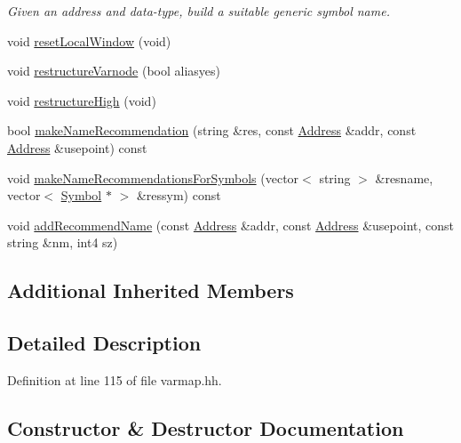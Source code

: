 \begin{DoxyCompactItemize}
\begin{DoxyCompactList}\small\item\em Given an address and data-\/type, build a suitable generic symbol name. \end{DoxyCompactList}\item 
void \mbox{\hyperlink{class_scope_local_a3bf9941188eb64423d2ed49a08dab8ca}{reset\+Local\+Window}} (void)
\item 
void \mbox{\hyperlink{class_scope_local_a4f0d61de6d043ae92af2c2cf1836453a}{restructure\+Varnode}} (bool aliasyes)
\item 
void \mbox{\hyperlink{class_scope_local_a308e308109ca1964d49d6a3a539a9acf}{restructure\+High}} (void)
\item 
bool \mbox{\hyperlink{class_scope_local_aff7d78a874e28f4798f6979d7f2edc50}{make\+Name\+Recommendation}} (string \&res, const \mbox{\hyperlink{class_address}{Address}} \&addr, const \mbox{\hyperlink{class_address}{Address}} \&usepoint) const
\item 
void \mbox{\hyperlink{class_scope_local_ae812b32473e4de47b9072370b75de94c}{make\+Name\+Recommendations\+For\+Symbols}} (vector$<$ string $>$ \&resname, vector$<$ \mbox{\hyperlink{class_symbol}{Symbol}} $\ast$ $>$ \&ressym) const
\item 
void \mbox{\hyperlink{class_scope_local_a288f953a04ec97281b8995d5559a6874}{add\+Recommend\+Name}} (const \mbox{\hyperlink{class_address}{Address}} \&addr, const \mbox{\hyperlink{class_address}{Address}} \&usepoint, const string \&nm, int4 sz)
\end{DoxyCompactItemize}
\subsection*{Additional Inherited Members}


\subsection{Detailed Description}


Definition at line 115 of file varmap.\+hh.



\subsection{Constructor \& Destructor Documentation}
\mbox{\label{class_scope_local_ac254c3908b456ecd7f2f50ca5a7d3f4d}} 
